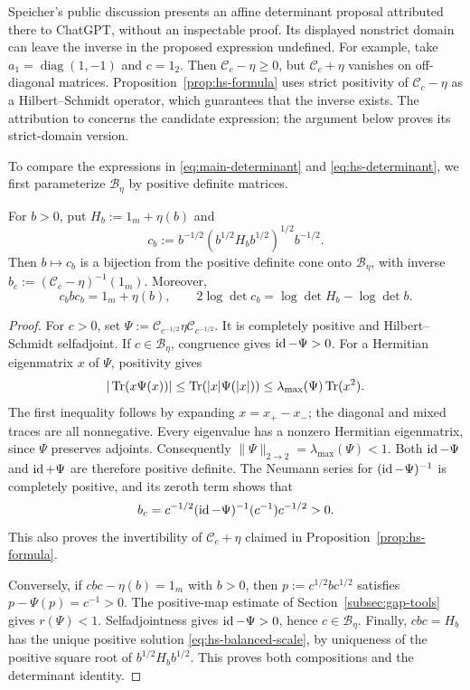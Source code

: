 \begin{remark}\label{rem:hs-strict-domain}
Speicher's public discussion \cite{Spe26} presents an affine determinant proposal attributed there to ChatGPT, without an inspectable proof.
Its displayed nonstrict domain can leave the inverse in the proposed expression undefined.
For example, take $a_1=\operatorname{diag}(1,-1)$ and $c=1_2$.
Then $\mathcal C_c-\eta\ge0$, but $\mathcal C_c+\eta$ vanishes on off-diagonal matrices.
Proposition~\ref{prop:hs-formula} uses strict positivity of $\mathcal C_c-\eta$ as a Hilbert--Schmidt operator, which guarantees that the inverse exists.
The attribution to \cite{Spe26} concerns the candidate expression; the argument below proves its strict-domain version.
\end{remark}

To compare the expressions in \eqref{eq:main-determinant} and \eqref{eq:hs-determinant}, we first parameterize $\mathcal B_\eta$ by positive definite matrices.

\begin{lemma}
\label{lem:hs-coordinates}
For $b>0$, put $H_b:=1_m+\eta(b)$ and
\begin{equation}\label{eq:hs-balanced-scale}
 c_b:=b^{-1/2}(b^{1/2}H_bb^{1/2})^{1/2}b^{-1/2}.
\end{equation}
Then $b\mapsto c_b$ is a bijection from the positive definite cone onto $\mathcal B_\eta$, with inverse $b_c:=(\mathcal C_c-\eta)^{-1}(1_m)$.
Moreover,
\begin{equation}\label{eq:hs-determinant-factor}
 c_bbc_b=1_m+\eta(b),\qquad
 2\log\det c_b=\log\det H_b-\log\det b.
\end{equation}
\end{lemma}
\begin{proof}
For $c>0$, set $\Psi:=\mathcal C_{c^{-1/2}}\eta\mathcal C_{c^{-1/2}}$.
It is completely positive and Hilbert--Schmidt selfadjoint.
If $c\in\mathcal B_\eta$, congruence gives $\operatorname{id}-\Psi>0$.
For a Hermitian eigenmatrix $x$ of $\Psi$, positivity gives
\[
 |\operatorname{Tr}(x\Psi(x))|\le\operatorname{Tr}(|x|\Psi(|x|))
       \le\lambda_{\max}(\Psi)\operatorname{Tr}(x^2).
\]
The first inequality follows by expanding $x=x_+-x_-$; the diagonal and mixed traces are all nonnegative.
Every eigenvalue has a nonzero Hermitian eigenmatrix, since $\Psi$ preserves adjoints.
Consequently $\|\Psi\|_{2\to2}=\lambda_{\max}(\Psi)<1$.
Both $\operatorname{id}-\Psi$ and $\operatorname{id}+\Psi$ are therefore positive definite.
The Neumann series for $(\operatorname{id}-\Psi)^{-1}$ is completely positive, and its zeroth term shows that
\[
 b_c=c^{-1/2}(\operatorname{id}-\Psi)^{-1}(c^{-1})c^{-1/2}>0.
\]
This also proves the invertibility of $\mathcal C_c+\eta$ claimed in Proposition~\ref{prop:hs-formula}.

Conversely, if $cbc-\eta(b)=1_m$ with $b>0$, then $p:=c^{1/2}bc^{1/2}$ satisfies $p-\Psi(p)=c^{-1}>0$.
The positive-map estimate of Section~\ref{subsec:gap-tools} gives $r(\Psi)<1$.
Selfadjointness gives $\operatorname{id}-\Psi>0$, hence $c\in\mathcal B_\eta$.
Finally, $cbc=H_b$ has the unique positive solution \eqref{eq:hs-balanced-scale}, by uniqueness of the positive square root of $b^{1/2}H_bb^{1/2}$.
This proves both compositions and the determinant identity.
\end{proof}

